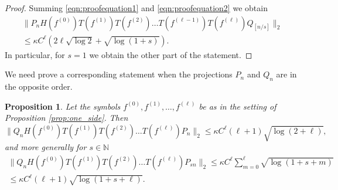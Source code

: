 \documentclass[11pt]{amsart}
\theoremstyle{plain}
\newtheorem{proposition}[theorem]{Proposition}
\theoremstyle{remark}
\numberwithin{equation}{section}
\begin{document}
\begin{proof}
Summing \eqref{eqn:proofequation1} and \eqref{eqn:proofequation2} we obtain
\begin{multline}
\| P_n H(f^{(0)}) T(f^{(1)}) T(f^{(2)})\ldots T(f^{(\ell-1)}) T(f^{(\ell)})Q_{[n/s]} \|_2
\\\leq \kappa C^{\ell} \left(2\ell \sqrt{\log 2}+\sqrt{\log(1+s)} \right).
\end{multline}
In particular, for $s=1$ we obtain the other part of the statement.
\end{proof}


We need prove a corresponding statement when the projections $P_n$ and $Q_n$ are in the opposite order.

\begin{proposition}\label{prop:other_side}
Let the symbols $f^{(0)},f^{(1)},\ldots, f^{(\ell)}$ be as in the setting of Proposition \ref{prop:one_side}. Then
$$
\|Q_n H(f^{(0)}) T(f^{(1)}) T(f^{(2)})\ldots T(f^{(\ell)}) P_n\|_2\leq \kappa C^{\ell} (\ell+1) \sqrt{\log(2+\ell)},
$$
and more generally for $s\in\mathbb{N}$
\begin{multline}\label{eqn:dyadic_qn_pn_general}
\|Q_n H(f^{(0)}) T(f^{(1)}) T(f^{(2)})\ldots T(f^{(\ell)}) P_{sn}\|_2\leq  \kappa C^{\ell}\sum_{m=0}^{\ell}\sqrt{\log(1+s+m)} 
\\\leq \kappa C^{\ell} (\ell+1)\sqrt{\log(1+s+\ell)}.
\end{multline}
\end{proposition}
\end{document}
